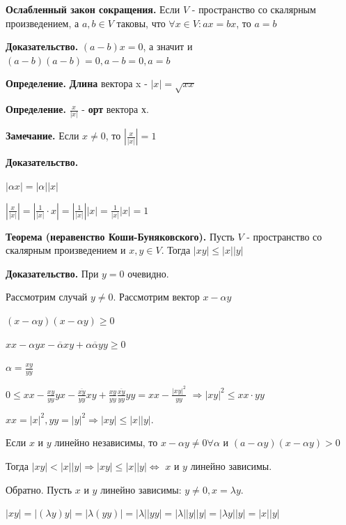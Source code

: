 \documentclass[a4paper]{article}
\begin{document}
\begin{htheorem}
\textbf{Ослабленный закон сокращения.} Если $V$ - пространство со скалярным произведением, а $a,b \in V$ таковы, что $\forall x \in V: ax = bx$, то $a=b$
\end{htheorem}

\begin{hproof}
\textbf{Доказательство.} $(a-b)x = 0$, а значит и $(a-b)(a-b) = 0, a-b = 0, a=b$
\end{hproof}

\textbf{Определение.} \textbf{Длина} вектора x - $|x| = \sqrt{xx}$

\textbf{Определение.} $\displaystyle \frac{x}{|x|}$ - \textbf{орт} вектора х.
\begin{htheorem}
\textbf{Замечание.} Если $x \neq 0$, то $\displaystyle \left| \frac{x}{|x|} \right| = 1$
\end{htheorem}

\begin{hproof}
\textbf{Доказательство.} 

$|\alpha x| = |\alpha||x|$

$\displaystyle  \left| \frac{x}{|x|} \right| =  \left| \frac{1}{|x|} \cdot x \right| =  \left| \frac{1}{|x|} \right| |x| =   \frac{1}{|x|} |x| = 1$
\end{hproof}

\begin{htheorem}
\textbf{Теорема (неравенство Коши-Буняковского).} Пусть $V$ - пространство со скалярным произведением и $x,y \in V$. Тогда $|xy| \leq |x||y|$
\end{htheorem}

\begin{hproof}
\textbf{Доказательство.} При $y=0$ очевидно.

Рассмотрим случай $y \neq 0$. Рассмотрим вектор $x -\alpha y$

$(x-\alpha y)(x-\alpha y) \geq 0$

$xx - \alpha y x - \overline{\alpha} x y + \alpha \overline{\alpha} y y \geq 0$

$\displaystyle \alpha = \frac{xy}{yy}$

$\displaystyle 0 \leq xx - \frac{xy}{yy} yx - \frac{\overline{xy}}{yy} xy +  \frac{xy}{yy} \frac{\overline{xy}}{yy} yy = xx - \frac{|xy|^2}{yy}$ $\Rightarrow |xy|^2 \leq xx \cdot yy$

$xx = |x|^2, yy = |y|^2 \Rightarrow |xy| \leq |x||y|$.

Если $x$ и $y$ линейно независимы, то $x- \alpha y \neq 0 \forall \alpha$ и $(a-\alpha y)(x-\alpha y) > 0$

Тогда $|xy| < |x||y| \Rightarrow |xy| \leq |x||y| \Leftrightarrow$ $x$ и $y$ линейно зависимы.

Обратно. Пусть $x$ и $y$ линейно зависимы: $y \neq 0, x = \lambda y$.

$|xy| = |(\lambda y) y| = |\lambda (yy)| = |\lambda| |yy| = |\lambda||y||y| = |\lambda y||y| = |x||y|$
\end{hproof}
\end{document}
